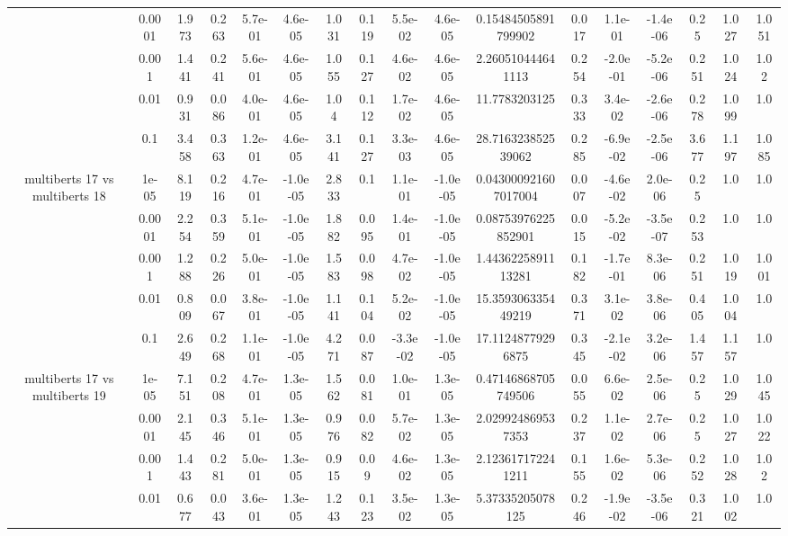 \begin{tabular}{|c|c|c|c|c|c|c|c|c|c|c|c|c|c|c|c|c|}
 & 0.0001 & 1.973 & 0.263 & 5.7e-01 & 4.6e-05 & 1.031 & 0.119 & 5.5e-02 & 4.6e-05 & 0.15484505891799902 & 0.017 & 1.1e-01 & -1.4e-06 & 0.25 & 1.027 & 1.051 \\
 & 0.001 & 1.441 & 0.241 & 5.6e-01 & 4.6e-05 & 1.055 & 0.127 & 4.6e-02 & 4.6e-05 & 2.260510444641113 & 0.254 & -2.0e-01 & -5.2e-06 & 0.251 & 1.024 & 1.02 \\
 & 0.01 & 0.931 & 0.086 & 4.0e-01 & 4.6e-05 & 1.04 & 0.112 & 1.7e-02 & 4.6e-05 & 11.7783203125 & 0.333 & 3.4e-02 & -2.6e-06 & 0.278 & 1.099 & 1.0 \\
 & 0.1 & 3.458 & 0.363 & 1.2e-01 & 4.6e-05 & 3.141 & 0.127 & 3.3e-03 & 4.6e-05 & 28.716323852539062 & 0.285 & -6.9e-02 & -2.5e-06 & 3.677 & 1.197 & 1.085 \\
\hline
\multirow{5}{*}{multiberts 17 vs multiberts 18} & 1e-05 & 8.119 & 0.216 & 4.7e-01 & -1.0e-05 & 2.833 & 0.1 & 1.1e-01 & -1.0e-05 & 0.043000921607017004 & 0.007 & -4.6e-02 & 2.0e-06 & 0.25 & 1.0 & 1.0 \\
 & 0.0001 & 2.254 & 0.359 & 5.1e-01 & -1.0e-05 & 1.882 & 0.095 & 1.4e-01 & -1.0e-05 & 0.08753976225852901 & 0.015 & -5.2e-02 & -3.5e-07 & 0.253 & 1.0 & 1.0 \\
 & 0.001 & 1.288 & 0.226 & 5.0e-01 & -1.0e-05 & 1.583 & 0.098 & 4.7e-02 & -1.0e-05 & 1.4436225891113281 & 0.182 & -1.7e-01 & 8.3e-06 & 0.251 & 1.019 & 1.001 \\
 & 0.01 & 0.809 & 0.067 & 3.8e-01 & -1.0e-05 & 1.141 & 0.104 & 5.2e-02 & -1.0e-05 & 15.359306335449219 & 0.371 & 3.1e-02 & 3.8e-06 & 0.405 & 1.004 & 1.0 \\
 & 0.1 & 2.649 & 0.268 & 1.1e-01 & -1.0e-05 & 4.271 & 0.087 & -3.3e-02 & -1.0e-05 & 17.11248779296875 & 0.345 & -2.1e-02 & 3.2e-06 & 1.457 & 1.157 & 1.0 \\
\hline
\multirow{5}{*}{multiberts 17 vs multiberts 19} & 1e-05 & 7.151 & 0.208 & 4.7e-01 & 1.3e-05 & 1.562 & 0.081 & 1.0e-01 & 1.3e-05 & 0.47146868705749506 & 0.055 & 6.6e-02 & 2.5e-06 & 0.25 & 1.029 & 1.045 \\
 & 0.0001 & 2.145 & 0.346 & 5.1e-01 & 1.3e-05 & 0.976 & 0.082 & 5.7e-02 & 1.3e-05 & 2.029924869537353 & 0.237 & 1.1e-02 & 2.7e-06 & 0.25 & 1.027 & 1.022 \\
 & 0.001 & 1.443 & 0.281 & 5.0e-01 & 1.3e-05 & 0.915 & 0.09 & 4.6e-02 & 1.3e-05 & 2.123617172241211 & 0.155 & 1.6e-02 & 5.3e-06 & 0.252 & 1.028 & 1.02 \\
 & 0.01 & 0.677 & 0.043 & 3.6e-01 & 1.3e-05 & 1.243 & 0.123 & 3.5e-02 & 1.3e-05 & 5.37335205078125 & 0.246 & -1.9e-02 & -3.5e-06 & 0.321 & 1.002 & 1.0 \\

\end{tabular}
